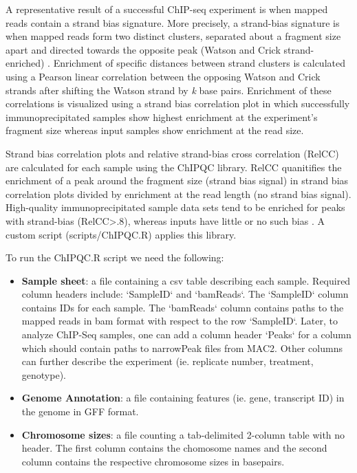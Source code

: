 \documentclass{article}
\begin{document}
\begin{sloppypar}
A representative result of a successful ChIP-seq experiment is when mapped reads contain a strand bias signature. More precisely, a strand-bias signature is when mapped reads form two distinct clusters, separated about a fragment size apart and  directed towards the opposite peak (Watson and Crick strand-enriched) \cite{Landt2012}. Enrichment of specific distances between strand clusters is calculated using a Pearson linear correlation between the opposing Watson and Crick strands after shifting the Watson strand by \textit{k} base pairs. Enrichment of these correlations is visualized using a strand bias correlation plot in which successfully immunoprecipitated samples show highest enrichment at the experiment's fragment size whereas input samples show enrichment at the read size. 


 Strand bias correlation plots and relative strand-bias cross correlation (RelCC) are calculated for each sample using the ChIPQC library. RelCC quanitifies the enrichment of a peak around the fragment size (strand bias signal) in strand bias correlation plots divided by enrichment at the read length (no strand bias signal).  High-quality immunoprecipitated sample data sets tend to be enriched for peaks with strand-bias (RelCC>.8), whereas inputs have little or no such bias \cite{Landt2012}. A custom script ({\selectfont scripts/ChIPQC.R}) applies this library. 
 
To run the ChIPQC.R script we need the following:
\begin{itemize}
  \item \textbf{Sample sheet}: a file containing a csv table describing each sample. Required column headers include: `SampleID` and `bamReads`. The `SampleID` column contains IDs for each sample. The `bamReads` column contains paths to the mapped reads in bam format with respect to the row `SampleID`. Later, to analyze ChIP-Seq samples, one can add a column header `Peaks` for a column which should contain paths to narrowPeak files from MAC2. Other columns can further describe the experiment (ie. replicate number, treatment, genotype).
  \item \textbf{Genome Annotation}: a file containing features (ie. gene, transcript ID) in the genome in GFF format.
  \item \textbf{Chromosome sizes}: a file counting a tab-delimited 2-column table with no header. The first column contains the chomosome names and the second column contains the respective chromosome sizes in basepairs.
\end{itemize}


\end{sloppypar}
\end{document}
